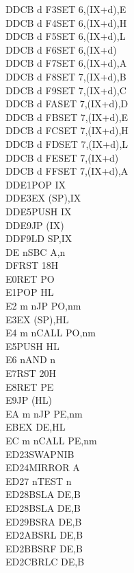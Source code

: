 \documentclass[12pt,twoside,openright,a4paper]{book}
\begin{document}
\begin{multicols}{3}
{\begin{tabbing}
	DDCB d F3\>SET 6,(IX+d),E\UNDOC\\
	DDCB d F4\>SET 6,(IX+d),H\UNDOC\\
	DDCB d F5\>SET 6,(IX+d),L\UNDOC\\
	DDCB d F6\>SET 6,(IX+d)\\
	DDCB d F7\>SET 6,(IX+d),A\UNDOC\\
	DDCB d F8\>SET 7,(IX+d),B\UNDOC\\
	DDCB d F9\>SET 7,(IX+d),C\UNDOC\\
	DDCB d FA\>SET 7,(IX+d),D\UNDOC\\
	DDCB d FB\>SET 7,(IX+d),E\UNDOC\\
	DDCB d FC\>SET 7,(IX+d),H\UNDOC\\
	DDCB d FD\>SET 7,(IX+d),L\UNDOC\\
	DDCB d FE\>SET 7,(IX+d)\\
	DDCB d FF\>SET 7,(IX+d),A\UNDOC\\
	DDE1\>POP IX\\
	DDE3\>EX (SP),IX\\
	DDE5\>PUSH IX\\
	DDE9\>JP (IX)\\
	DDF9\>LD SP,IX\\
	DE n\>SBC A,n\\
	DF\>RST 18H\\
	E0\>RET PO\\
	E1\>POP HL\\
	E2 m n\>JP PO,nm\\
	E3\>EX (SP),HL\\
	E4 m n\>CALL PO,nm\\
	E5\>PUSH HL\\
	E6 n\>AND n\\
	E7\>RST 20H\\
	E8\>RET PE\\
	E9\>JP (HL)\\
	EA m n\>JP PE,nm\\
	EB\>EX DE,HL\\
	EC m n\>CALL PE,nm\\
	ED23\>SWAPNIB\ZXN\\
	ED24\>MIRROR A\ZXN\\
	ED27 n\>TEST n\ZXN\\
	ED28\>BSLA DE,B\ZXN\\
	ED28\>BSLA DE,B\ZXN\\
	ED29\>BSRA DE,B\ZXN\\
	ED2A\>BSRL DE,B\ZXN\\
	ED2B\>BSRF DE,B\ZXN\\
	ED2C\>BRLC DE,B\ZXN\\

\end{tabbing}}
\end{multicols}
\end{document}
